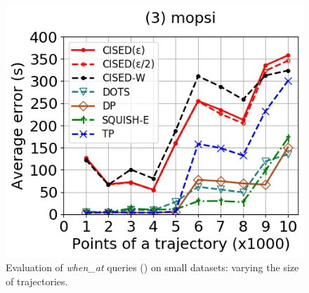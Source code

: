 {\begin{figure}[tb!]
	\includegraphics[scale=0.350]{Figures/Exp-when-SED-error-size-mopsi.jpg}		
	\vspace{-2ex}
	\caption{\small {Evaluation of \emph{when\_at} queries (\sed) on small datasets: varying the size of
			trajectories.}}
	\label{fig:query-when-sed-size}
	\vspace{-1ex}
\end{figure}


}
